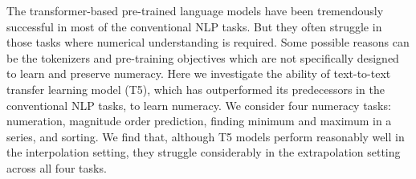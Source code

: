 The transformer-based pre-trained language models have been tremendously successful in most of the conventional NLP tasks. But they often struggle in those tasks where numerical understanding is required. Some possible reasons can be the tokenizers and pre-training objectives which are not specifically designed to learn and preserve numeracy. Here we investigate the ability of text-to-text transfer learning model (T5), which has outperformed its predecessors in the conventional NLP tasks, to learn numeracy. We consider four numeracy tasks: numeration, magnitude order prediction, finding minimum and maximum in a series, and sorting. We find that, although T5 models perform reasonably well in the interpolation setting, they struggle considerably in the extrapolation setting across all four tasks.
